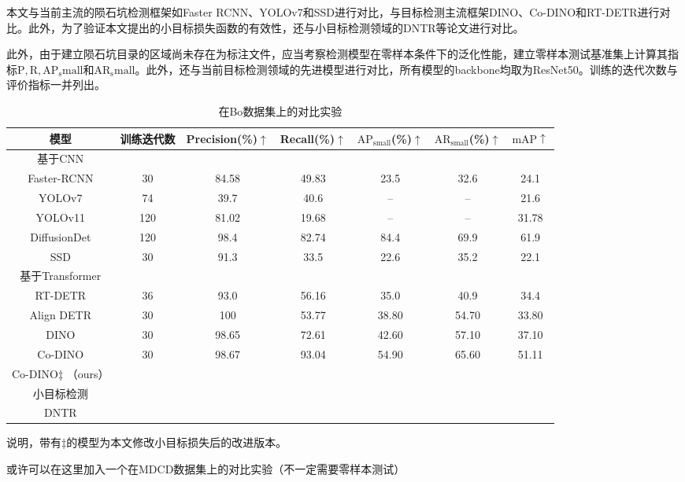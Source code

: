 本文与当前主流的陨石坑检测框架如Faster RCNN、YOLOv7和SSD进行对比，与目标检测主流框架DINO、Co-DINO和RT-DETR进行对比。此外，为了验证本文提出的小目标损失函数的有效性，还与小目标检测领域的DNTR等论文进行对比。
\par 此外，由于建立陨石坑目录的区域尚未存在为标注文件，应当考察检测模型在零样本条件下的泛化性能，建立零样本测试基准集\cite{boCatalogueMeterscaleImpact2022}上计算其指标$\mathrm{P,R,AP_small}$和$\mathrm{AR_small}$。此外，还与当前目标检测领域的先进模型进行对比，所有模型的backbone均取为ResNet50。训练的迭代次数与评价指标一并列出。
\begin{table}[H]
  \begin{center}
  \caption{在Bo\cite{boCatalogueMeterscaleImpact2022}数据集上的对比实验}
  \label{tab:detect-comp}
  \begin{tabular}{ c  c  c  c  c  c c}
  \toprule
  模型 & 训练迭代数 & 
  Precision(\%)$\uparrow$ & Recall(\%)$\uparrow$ & $\mathrm{AP}_\mathrm{small}$(\%)$\uparrow$ & $\mathrm{AR}_\mathrm{small}$(\%)$\uparrow$& $\mathrm{mAP}\uparrow$ \\
  \hline
  基于CNN & & & & & & \\
  Faster-RCNN & 30 & 84.58 & 49.83 & 23.5 & 32.6 & 24.1\\
  YOLOv7 & 74 & 39.7 & 40.6 & -- & -- & 21.6 \\
  YOLOv11 & 120 & 81.02 & 19.68 & -- & -- & 31.78\\
  DiffusionDet &120 & 98.4 & 82.74 & 84.4 & 69.9&61.9  \\
  SSD & 30 & 91.3 &33.5 &22.6 &35.2&22.1 \\
  \hline
  基于Transformer & & & & && \\
  RT-DETR & 36 & 93.0 & 56.16 & 35.0 & 40.9& 34.4\\
  Align DETR&30 & 100 & 53.77 & 38.80 & 54.70 & 33.80\\
  DINO &30 &98.65 &72.61 &42.60 &57.10 &37.10\\
  Co-DINO &30 &98.67 & 93.04 & 54.90 & 65.60 & 51.11\\
  Co-DINO$\ddagger$ （ours）& & & & & &\\
  \hline
  小目标检测 & & & & & & \\
  DNTR\cite{liuDeNoisingFPNTransformer2024}& & & & & &  \\
  \bottomrule 
  \end{tabular}
  \end{center}
\end{table}
说明，带有$\ddagger$的模型为本文修改小目标损失后的改进版本。
\par 或许可以在这里加入一个在MDCD数据集上的对比实验（不一定需要零样本测试）

